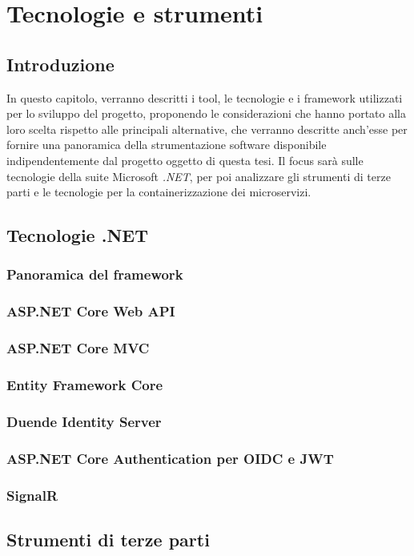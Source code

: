 \chapter{Tecnologie e strumenti}
\section{Introduzione}
In questo capitolo, verranno descritti i tool, le tecnologie e i framework utilizzati per lo sviluppo del progetto, proponendo le considerazioni che hanno portato alla loro scelta rispetto alle principali alternative, che verranno descritte anch'esse per fornire una panoramica della strumentazione software disponibile indipendentemente dal progetto oggetto di questa tesi.
Il focus sarà sulle tecnologie della suite Microsoft \emph{.NET}, per poi analizzare gli strumenti di terze parti e le tecnologie per la containerizzazione dei microservizi.

\section{Tecnologie .NET}
\subsection{Panoramica del framework}

\subsection{ASP.NET Core Web API}
\subsection{ASP.NET Core MVC}
\subsection{Entity Framework Core}
\subsection{Duende Identity Server}
\subsection{ASP.NET Core Authentication per OIDC e JWT}
\subsection{SignalR}
\section{Strumenti di terze parti}
